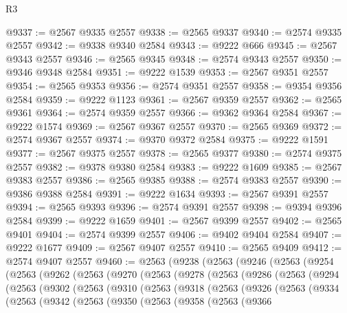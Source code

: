 \begin{lexlean}{R3}
\begin{coremodule}
@9337 := @2567 @9335 @2557
@9338 := @2565 @9337
@9340 := @2574 @9335 @2557
@9342 := @9338 @9340 @2584
@9343 := @9222 @666
@9345 := @2567 @9343 @2557
@9346 := @2565 @9345
@9348 := @2574 @9343 @2557
@9350 := @9346 @9348 @2584
@9351 := @9222 @1539
@9353 := @2567 @9351 @2557
@9354 := @2565 @9353
@9356 := @2574 @9351 @2557
@9358 := @9354 @9356 @2584
@9359 := @9222 @1123
@9361 := @2567 @9359 @2557
@9362 := @2565 @9361
@9364 := @2574 @9359 @2557
@9366 := @9362 @9364 @2584
@9367 := @9222 @1574
@9369 := @2567 @9367 @2557
@9370 := @2565 @9369
@9372 := @2574 @9367 @2557
@9374 := @9370 @9372 @2584
@9375 := @9222 @1591
@9377 := @2567 @9375 @2557
@9378 := @2565 @9377
@9380 := @2574 @9375 @2557
@9382 := @9378 @9380 @2584
@9383 := @9222 @1609
@9385 := @2567 @9383 @2557
@9386 := @2565 @9385
@9388 := @2574 @9383 @2557
@9390 := @9386 @9388 @2584
@9391 := @9222 @1634
@9393 := @2567 @9391 @2557
@9394 := @2565 @9393
@9396 := @2574 @9391 @2557
@9398 := @9394 @9396 @2584
@9399 := @9222 @1659
@9401 := @2567 @9399 @2557
@9402 := @2565 @9401
@9404 := @2574 @9399 @2557
@9406 := @9402 @9404 @2584
@9407 := @9222 @1677
@9409 := @2567 @9407 @2557
@9410 := @2565 @9409
@9412 := @2574 @9407 @2557
@9460 := @2563
    (@9238
      (@2563
        (@9246
          (@2563
            (@9254
              (@2563
                (@9262
                  (@2563
                    (@9270
                      (@2563
                        (@9278
                          (@2563
                            (@9286
                              (@2563
                                (@9294
                                  (@2563
                                    (@9302
                                      (@2563
                                        (@9310
                                          (@2563
                                            (@9318
                                              (@2563
                                                (@9326
                                                  (@2563
                                                    (@9334
                                                      (@2563
                                                        (@9342
                                                          (@2563
                                                            (@9350
                                                              (@2563
                                                                (@9358
                                                                  (@2563
                                                                    (@9366

\end{coremodule}
\end{lexlean}
